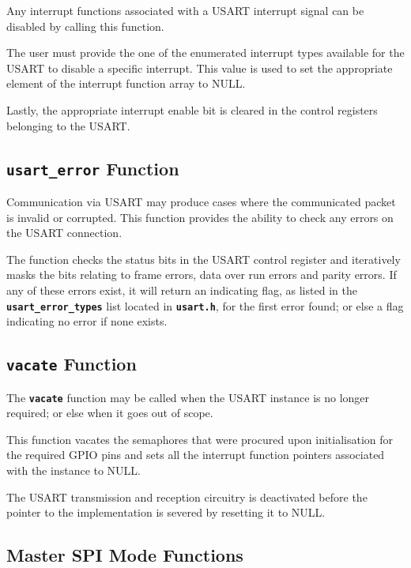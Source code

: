 \documentclass[a4paper, oneside, 11pt, titlepage, onecolumn, openright]{report}
\begin{document}
{{			Any interrupt functions associated with a USART interrupt signal can be disabled by calling this function.
			
			The user must provide the one of the enumerated interrupt types available for the USART to disable a specific interrupt. This value is used to set the appropriate element of the interrupt function array to NULL.
			
			Lastly, the appropriate interrupt enable bit is cleared in the control registers belonging to the USART.
			
\subsection{\textbf{\texttt{usart\_error}} Function}
			\label{ss:HALusart_errorFunction}
			
			Communication via USART may produce cases where the communicated packet is invalid or corrupted. This function provides the ability to check any errors on the USART connection.
			
			The function checks the status bits in the USART control register and iteratively masks the bits relating to frame errors, data over run errors and parity errors. If any of these errors exist, it will return an indicating flag, as listed in the \textbf{\texttt{usart\_error\_types}} list located in \textbf{\texttt{usart.h}}, for the first error found; or else a flag indicating no error if none exists.
			
\subsection{\textbf{\texttt{vacate}} Function}
			\label{ss:HALusartvacateFunction}
			
			The \textbf{\texttt{vacate}} function may be called when the USART instance is no longer required; or else when it goes out of scope.
			
			This function vacates the semaphores that were procured upon initialisation for the required GPIO pins and sets all the interrupt function pointers associated with the instance to NULL.
			
			The USART transmission and reception circuitry is deactivated before the pointer to the implementation is severed by resetting it to NULL.

\subsection{Master SPI Mode Functions}
			\label{ss:HALusartMasterSPIModeFunctions}
			
}}
\end{document}
